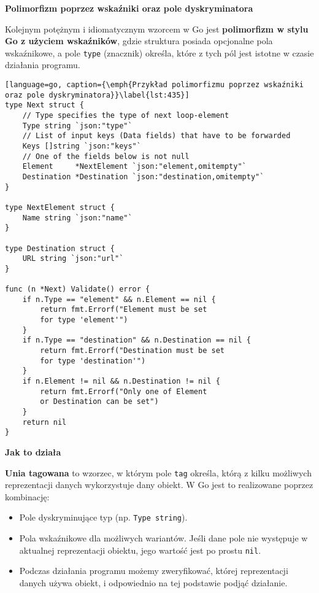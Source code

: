 \textbf{Polimorfizm poprzez wskaźniki oraz pole dyskryminatora}

Kolejnym potężnym i idiomatycznym wzorcem w Go jest \textbf{polimorfizm w stylu Go z użyciem wskaźników}, gdzie struktura posiada opcjonalne pola wskaźnikowe, a pole \texttt{type} (znacznik) określa, które z tych pól jest istotne w czasie działania programu.

\begin{lstlisting}[language=go, caption={\emph{Przykład polimorfizmu poprzez wskaźniki oraz pole dyskryminatora}}\label{lst:435}]
type Next struct {
	// Type specifies the type of next loop-element
	Type string `json:"type"`
	// List of input keys (Data fields) that have to be forwarded
	Keys []string `json:"keys"`
	// One of the fields below is not null
	Element     *NextElement `json:"element,omitempty"`
	Destination *Destination `json:"destination,omitempty"`
}

type NextElement struct {
	Name string `json:"name"`
}

type Destination struct {
	URL string `json:"url"`
}

func (n *Next) Validate() error {
	if n.Type == "element" && n.Element == nil {
		return fmt.Errorf("Element must be set 
        for type 'element'")
	}
	if n.Type == "destination" && n.Destination == nil {
		return fmt.Errorf("Destination must be set 
        for type 'destination'")
	}
	if n.Element != nil && n.Destination != nil {
		return fmt.Errorf("Only one of Element 
        or Destination can be set")
	}
	return nil
}
\end{lstlisting}

\textbf{Jak to działa}

\textbf{Unia tagowana} to wzorzec, w którym pole \texttt{tag} określa, którą z kilku możliwych reprezentacji danych wykorzystuje dany obiekt. W Go jest to realizowane poprzez kombinację:

\begin{itemize}
    \item Pole dyskryminujące typ (np. \texttt{Type string}).
    \item Pola wskaźnikowe dla możliwych wariantów. Jeśli dane pole nie występuje w aktualnej reprezentacji obiektu, jego wartość jest po prostu \texttt{nil}.
    \item Podczas działania programu możemy zweryfikować, której reprezentacji danych używa obiekt, i odpowiednio na tej podstawie podjąć działanie.
\end{itemize}

